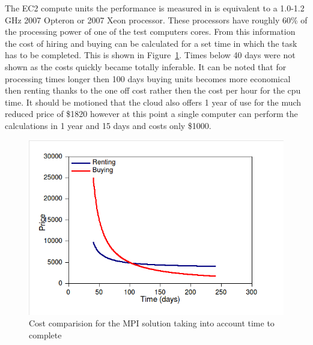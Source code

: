 The EC2 compute units the performance is measured in is equivalent to a 1.0-1.2 GHz 2007 Opteron or 2007 Xeon processor. These processors have roughly 60\% of the processing power of one of the test computers cores. From this information the cost of hiring and buying can be calculated for a set time in which the task has to be completed. This is shown in Figure~\ref{mpi-time-money}. Times below 40 days were not shown as the costs quickly became totally inferable. It can be noted that for processing times longer then 100 days buying units becomes more economical then renting thanks to the one off cost rather then the cost per hour for the cpu time. It should be motioned that the cloud also offers 1 year of use for the much reduced price of \$1820 however at this point a single computer can perform the calculations in 1 year and 15 days and costs only \$1000.

\begin{figure}[ht]
	\begin{center}
		\includegraphics[width=1.0\textwidth]{mpi-time-money}
	\end{center}
	\caption{Cost comparision for the MPI solution taking into account time to complete}
	\label{mpi-time-money}
\end{figure}
